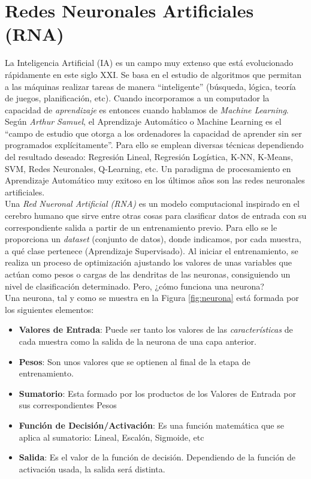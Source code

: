 \section{Redes Neuronales Artificiales (RNA)}
\label{sec:redes_neuronales}
La Inteligencia Artificial (IA) es un campo muy extenso que está evolucionado rápidamente en este siglo XXI. Se basa en el estudio de algoritmos que permitan a las máquinas realizar tareas de manera ``inteligente'' (búsqueda, lógica, teoría de juegos, planificación, etc). Cuando incorporamos a un computador la capacidad de \textit{aprendizaje} es entonces cuando hablamos de \textit{Machine Learning}.\\

Según \emph{Arthur Samuel}, el Aprendizaje Automático o Machine Learning es el ``campo de estudio que otorga a los ordenadores la capacidad de aprender sin ser programados explícitamente''. Para ello se emplean diversas técnicas dependiendo del resultado deseado: Regresión Lineal, Regresión Logística, K-NN, K-Means, SVM, Redes Neuronales, Q-Learning, etc. Un paradigma de procesamiento en Aprendizaje Automático muy exitoso en los últimos años son las redes neuronales artificiales.\\

Una \textit{Red Nueronal Artificial (RNA)} es un modelo computacional inspirado en el cerebro humano que sirve entre otras cosas para clasificar datos de entrada con su correspondiente salida a partir de un entrenamiento previo. Para ello se le proporciona un \textit{dataset} (conjunto de datos), donde indicamos, por cada muestra, a qué clase pertenece (Aprendizaje Supervisado). Al iniciar el entrenamiento, se realiza un proceso de optimización ajustando los valores de unas variables que actúan como pesos o cargas de las dendritas de las neuronas, consiguiendo un nivel de clasificación determinado. Pero, ¿cómo funciona una neurona?\\

Una neurona, tal y como se muestra en la Figura \ref{fig:neurona} está formada por los siguientes elementos:
\begin{itemize}
	\item \textbf{Valores de Entrada}: Puede ser tanto los valores de las \textit{características} de cada muestra como la salida de la neurona de una capa anterior.
	\item \textbf{Pesos}: Son unos valores que se optienen al final de la etapa de entrenamiento.
	\item \textbf{Sumatorio}: Esta formado por los productos de los Valores de Entrada por sus correspondientes Pesos
	\item \textbf{Función de Decisión/Activación}: Es una función matemática que se aplica al sumatorio: Lineal, Escalón, Sigmoide, etc
	\item \textbf{Salida}: Es el valor de la función de decisión. Dependiendo de la función de activación usada, la salida será distinta.
\end{itemize}


